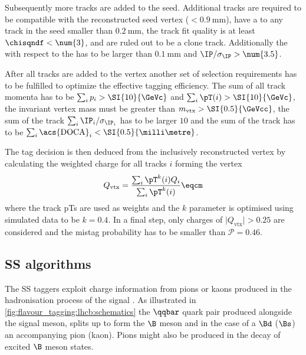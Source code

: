 Subsequently more tracks are added to the seed. Additional tracks are required
to be compatible with the reconstructed seed vertex
(\IP$<\SI{0.9}{\milli\metre}$), have a \DOCA to any track in the seed smaller
than $\SI{0.2}{\milli\metre}$, the track fit quality is at least
$\chisqndf<\num{3}$, and are ruled out to be a clone track. Additionally the \IP
with respect to the \PV has to be larger than $\SI{0.1}{\milli\metre}$ and
$\text{\IP}/\sigma_\text{\IP}>\num{3.5}$.

After all tracks are added to the vertex another set of selection requirements
has to be fulfilled to optimize the effective tagging efficiency. The sum of all
track momenta has to be $\sum_i p_i > \SI{10}{\GeVc}$ and $\sum_i \pT(i) >
\SI{10}{\GeVc}$, the invariant vertex mass must be greater than $m_\text{vtx} >
\SI{0.5}{\GeVcc}$, the sum of the track
$\sum_i\text{\IP}_i/\sigma_{\text{\IP}_i}$ has to be larger $\num{10}$ and the
sum of the track \DOCA has to be $\sum_i\text{\acs{DOCA}}_i <
\SI{0.5}{\milli\metre}$.

The tag decision is then deduced from the inclusively reconstructed vertex by
calculating the weighted charge for all tracks $i$ forming the vertex
%
\begin{equation}\label{eq:flavour_tagging:os:vertex:charge}
  Q_\text{vtx} = \frac{\sum_i \pT^k(i)Q_i}{\sum_i\pT^k(i)}\eqcm
\end{equation}
where the track \acfp{pT} are used as weights and the $k$ parameter is optimised
using simulated data to be $k=\num{0.4}$. In a final step, only charges of
$\vert Q_\text{vtx} \vert > 0.25$ are considered and the mistag probability has
to be smaller than $\mathcal{P}=0.46$.

\subsection{\Acl{SS} algorithms}
\label{sec:flavour_tagging:ss}

The \acl{SS} taggers exploit charge information from pions or kaons produced in
the hadronisation process of the signal \Bmeson. As illustrated in
\cref{fig:flavour_tagging:lhcb:schematics} the $\qqbar$ quark pair produced
alongside the signal meson, splits up to form the $\B$ meson and in the case of
a $\Bd$ ($\Bs$) an accompanying pion (kaon). Pions might also be produced in the
decay of excited $\B$ meson states.

